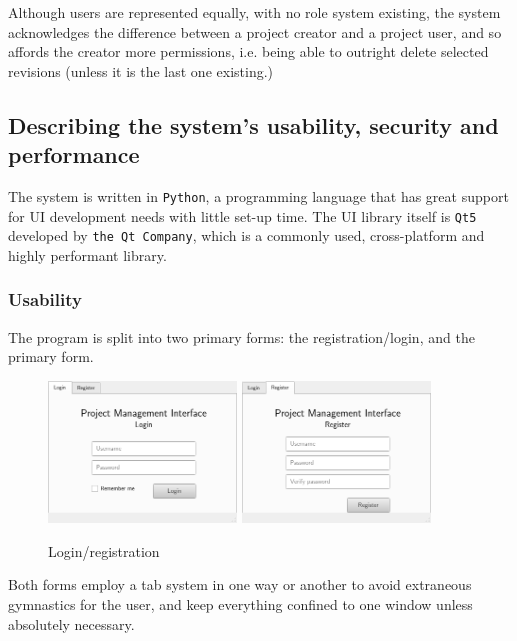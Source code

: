 \documentclass{report}
\begin{document}
	Although users are represented equally, with no role system existing, the system acknowledges the difference
	between a project creator and a project user, and so affords the creator more permissions, i.e. being able to
	outright delete selected revisions (unless it is the last one existing.)
	
	\subsection{Describing the system's usability, security and performance}
	
	The system is written in \verb|Python|, a programming language that has great support for UI development
	needs with little set-up time. The UI library itself is \verb|Qt5| developed by \verb|the Qt Company|, which is
	a commonly used, cross-platform and highly performant library.
	
	\subsubsection{Usability}
	
	The program is split into two primary forms: the registration/login, and the primary form.
	\vspace{1em}
	\begin{figure}[h]
		\centering
		\includegraphics[width=5cm]{login}
		\qquad
		\includegraphics[width=5cm]{register}
		\caption{Login/registration}
	\end{figure}
	Both forms employ a tab system in one way or another to avoid extraneous gymnastics for the user, and
	keep everything confined to one window unless absolutely necessary.
	
\end{document}
